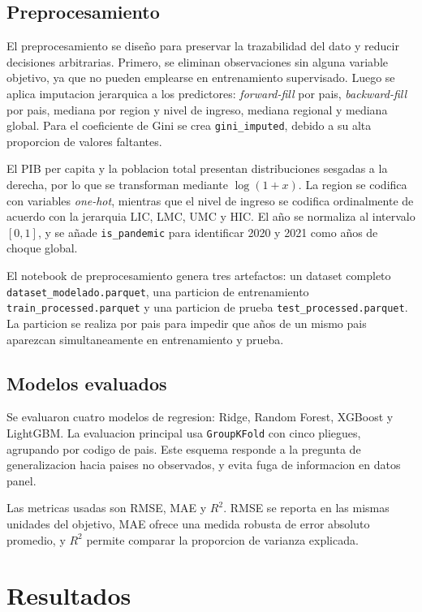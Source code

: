 \documentclass[conference]{IEEEtran}
\begin{document}
\subsection{Preprocesamiento}

El preprocesamiento se diseño para preservar la trazabilidad del dato y reducir decisiones arbitrarias. Primero, se eliminan observaciones sin alguna variable objetivo, ya que no pueden emplearse en entrenamiento supervisado. Luego se aplica imputacion jerarquica a los predictores: \textit{forward-fill} por pais, \textit{backward-fill} por pais, mediana por region y nivel de ingreso, mediana regional y mediana global. Para el coeficiente de Gini se crea \texttt{gini\_imputed}, debido a su alta proporcion de valores faltantes.

El PIB per capita y la poblacion total presentan distribuciones sesgadas a la derecha, por lo que se transforman mediante \(\log(1+x)\). La region se codifica con variables \textit{one-hot}, mientras que el nivel de ingreso se codifica ordinalmente de acuerdo con la jerarquia LIC, LMC, UMC y HIC. El año se normaliza al intervalo \([0,1]\), y se añade \texttt{is\_pandemic} para identificar 2020 y 2021 como años de choque global.

El notebook de preprocesamiento genera tres artefactos: un dataset completo \texttt{dataset\_modelado.parquet}, una particion de entrenamiento \texttt{train\_processed.parquet} y una particion de prueba \texttt{test\_processed.parquet}. La particion se realiza por pais para impedir que años de un mismo pais aparezcan simultaneamente en entrenamiento y prueba.

\subsection{Modelos evaluados}

Se evaluaron cuatro modelos de regresion: Ridge, Random Forest, XGBoost y LightGBM. La evaluacion principal usa \texttt{GroupKFold} con cinco pliegues, agrupando por codigo de pais. Este esquema responde a la pregunta de generalizacion hacia paises no observados, y evita fuga de informacion en datos panel.

Las metricas usadas son RMSE, MAE y \(R^2\). RMSE se reporta en las mismas unidades del objetivo, MAE ofrece una medida robusta de error absoluto promedio, y \(R^2\) permite comparar la proporcion de varianza explicada.

\section{Resultados}
\end{document}
